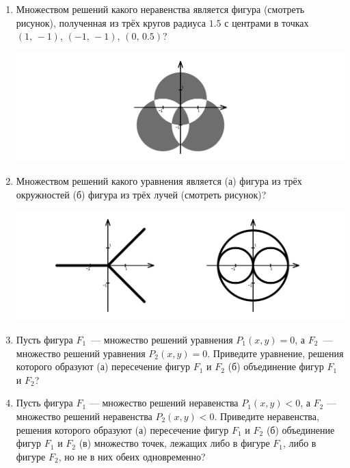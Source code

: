 \begin{enumerate}
\item Множеством решений какого неравенства является фигура (смотреть рисунок), полученная из трёх кругов радиуса $1.5$ с центрами в точках $(1,\,-1)$, $(-1,\,-1)$, $(0,\,0.5)$?

\centerline{\includegraphics[width=13.75cm]{stats/2018/graph/3}}

\item Множеством решений какого уравнения является (а) фигура из трёх окружностей (б) фигура из трёх лучей (смотреть рисунок)?

\centerline{\includegraphics[width=13.75cm]{stats/2018/graph/4}}

\item Пусть фигура $F_1$~— множество решений уравнения $P_1(x,y) = 0$, а $F_2$~— множество решений уравнения $P_2 (x,y) = 0$. Приведите уравнение, решения которого образуют (а) пересечение фигур $F_1$ и $F_2$ (б) объединение фигур $F_1$ и $F_2$?

\item Пусть фигура $F_1$ — множество решений неравенства $P_1(x,y) < 0$, а $F_2$ — множество решений неравенства $P_2 (x,y) < 0$. Приведите неравенства, решения которого образуют (а) пересечение фигур $F_1$ и $F_2$ (б) объединение фигур $F_1$ и $F_2$ (в) множество точек, лежащих либо в фигуре $F_1$, либо в фигуре $F_2$, но не в них обеих одновременно?

\end{enumerate}